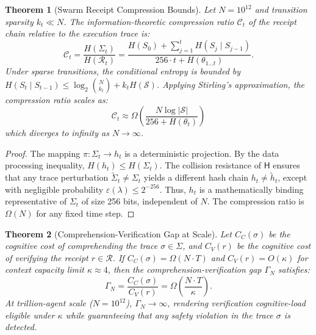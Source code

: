 \documentclass[11pt,oneside]{book}
\theoremstyle{definition}
\theoremstyle{plain}
\newtheorem{theorem}{Theorem}[chapter]
\theoremstyle{remark}
\newcommand{\chainH}{\mathsf{H}}               %
\newcommand{\CL}{\kappa}                       %
\begin{document}
\begin{theorem}[Swarm Receipt Compression Bounds]\label{thm:compression}
Let $N = 10^{12}$ and transition sparsity $k_t \ll N$. %
The information-theoretic compression ratio $\mathcal{C}_t$ of the receipt chain relative to the execution trace is:
\[
\mathcal{C}_t = \frac{H(\Sigma_t)}{H(\mathcal{R}_t)} = \frac{H(S_0) + \sum_{j=1}^t H(S_j \mid S_{j-1})}{256 \cdot t + H(\theta_{1\dots t})}.
\]
Under sparse transitions, the conditional entropy is bounded by $H(S_t \mid S_{t-1}) \le \log_2 \binom{N}{k_t} + k_t H(\mathcal{S})$. %
Applying Stirling's approximation, the compression ratio scales as:
\[
\mathcal{C}_t \approx \Omega\left( \frac{N \log |\mathcal{S}|}{256 + H(\theta_t)} \right)
\]
which diverges to infinity as $N \to \infty$. %
\end{theorem}

\begin{proof}
The mapping $\pi: \Sigma_t \to h_t$ is a deterministic projection. %
By the data processing inequality, $H(h_t) \le H(\Sigma_t)$. %
The collision resistance of $\chainH$ ensures that any trace perturbation $\tilde{\Sigma}_t \neq \Sigma_t$ yields a different hash chain $h_t \neq \tilde{h}_t$, except with negligible probability $\varepsilon(\lambda) \le 2^{-256}$. %
Thus, $h_t$ is a mathematically binding representative of $\Sigma_t$ of size 256 bits, independent of $N$. %
The compression ratio is $\Omega(N)$ for any fixed time step. %
\end{proof}

\begin{theorem}[Comprehension-Verification Gap at Scale]\label{thm:gap_scale}
Let $C_C(\sigma)$ be the cognitive cost of comprehending the trace $\sigma \in \Sigma$, and $C_V(r)$ be the cognitive cost of verifying the receipt $r \in \mathcal{R}$. %
If $C_C(\sigma) = \Omega(N \cdot T)$ and $C_V(r) = O(\CL)$ for context capacity limit $\CL \approx 4$, then the comprehension-verification gap $\Gamma_N$ satisfies:
\[
\Gamma_N = \frac{C_C(\sigma)}{C_V(r)} = \Omega\left( \frac{N \cdot T}{\CL} \right).
\]
At trillion-agent scale ($N = 10^{12}$), $\Gamma_N \to \infty$, rendering verification cognitive-load eligible under $\CL$ while guaranteeing that any safety violation in the trace $\sigma$ is detected. %
\end{theorem}
\end{document}
